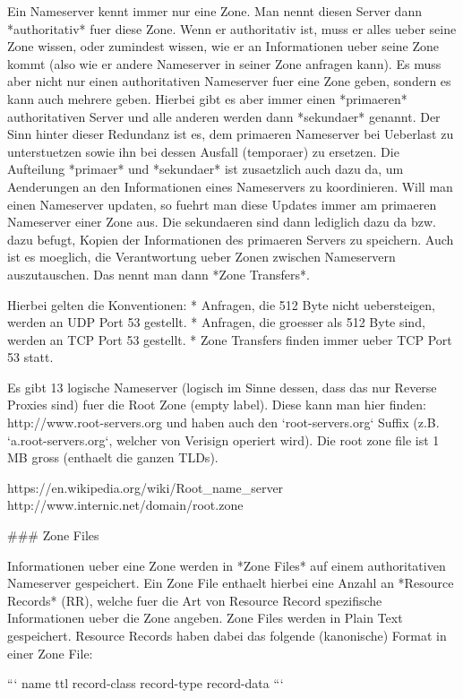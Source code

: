 Ein Nameserver kennt immer nur eine Zone. Man nennt diesen Server dann
*authoritativ* fuer diese Zone. Wenn er authoritativ ist, muss er alles ueber
seine Zone wissen, oder zumindest wissen, wie er an Informationen ueber seine
Zone kommt (also wie er andere Nameserver in seiner Zone anfragen kann). Es muss
aber nicht nur einen authoritativen Nameserver fuer eine Zone geben, sondern es
kann auch mehrere geben. Hierbei gibt es aber immer einen *primaeren*
authoritativen Server und alle anderen werden dann *sekundaer* genannt. Der Sinn
hinter dieser Redundanz ist es, dem primaeren Nameserver bei Ueberlast zu
unterstuetzen sowie ihn bei dessen Ausfall (temporaer) zu ersetzen. Die
Aufteilung *primaer* und *sekundaer* ist zusaetzlich auch dazu da, um
Aenderungen an den Informationen eines Nameservers zu koordinieren. Will man
einen Nameserver updaten, so fuehrt man diese Updates immer am primaeren
Nameserver einer Zone aus. Die sekundaeren sind dann lediglich dazu da bzw. dazu
befugt, Kopien der Informationen des primaeren Servers zu speichern. Auch ist es
moeglich, die Verantwortung ueber Zonen zwischen Nameservern auszutauschen. Das
nennt man dann *Zone Transfers*.

Hierbei gelten die Konventionen:
* Anfragen, die 512 Byte nicht uebersteigen, werden an UDP Port 53 gestellt.
* Anfragen, die groesser als 512 Byte sind, werden an TCP Port 53 gestellt.
* Zone Transfers finden immer ueber TCP Port 53 statt.

Es gibt 13 logische Nameserver (logisch im Sinne dessen, dass das nur Reverse
Proxies sind) fuer die Root Zone (empty label). Diese kann man hier finden:
http://www.root-servers.org und haben auch den `root-servers.org` Suffix
(z.B. `a.root-servers.org`, welcher von Verisign operiert wird). Die root zone
file ist 1 MB gross (enthaelt die ganzen
TLDs).

https://en.wikipedia.org/wiki/Root_name_server
http://www.internic.net/domain/root.zone

### Zone Files

Informationen ueber eine Zone werden in *Zone Files* auf einem authoritativen
Nameserver gespeichert. Ein Zone File enthaelt hierbei eine Anzahl an *Resource
Records* (RR), welche fuer die Art von Resource Record spezifische Informationen
ueber die Zone angeben. Zone Files werden in Plain Text gespeichert. Resource
Records haben dabei das folgende (kanonische) Format in einer Zone File:

```
name ttl record-class record-type record-data
```

